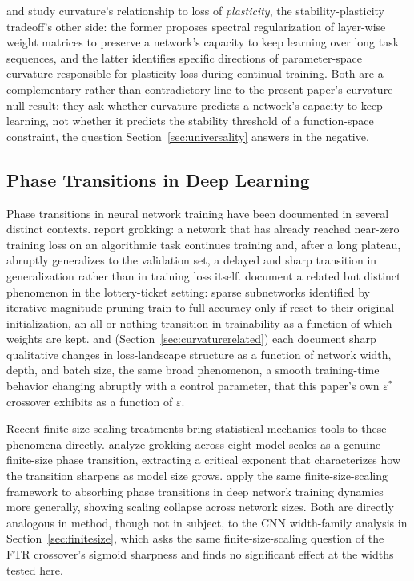 \documentclass[11pt]{article}
\newcommand{\eps}{\varepsilon}
\newcommand{\epsstar}{\eps^{*}}
\begin{document}
\citet{lewandowski2025spectral} and \citet{lewandowski2024directions}
study curvature's relationship to loss of \emph{plasticity}, the
stability-plasticity tradeoff's other side: the former proposes spectral
regularization of layer-wise weight matrices to preserve a network's
capacity to keep learning over long task sequences, and the latter
identifies specific directions of parameter-space curvature responsible
for plasticity loss during continual training. Both are a complementary
rather than contradictory line to the present paper's curvature-null
result: they ask whether curvature predicts a network's capacity to keep
learning, not whether it predicts the stability threshold of a
function-space constraint, the question Section~\ref{sec:universality}
answers in the negative.

\subsection{Phase Transitions in Deep Learning}
Phase transitions in neural network training have been documented in
several distinct contexts. \citet{power2022grokking} report grokking: a
network that has already reached near-zero training loss on an
algorithmic task continues training and, after a long plateau, abruptly
generalizes to the validation set, a delayed and sharp transition in
generalization rather than in training loss itself. \citet{frankle2018lottery}
document a related but distinct phenomenon in the lottery-ticket setting:
sparse subnetworks identified by iterative magnitude pruning train to full
accuracy only if reset to their original initialization, an all-or-nothing
transition in trainability as a function of which weights are kept.
\citet{li2018visualizing} and \citet{keskar2016large}
(Section~\ref{sec:curvaturerelated}) each document sharp qualitative
changes in loss-landscape structure as a function of network width, depth,
and batch size, the same broad phenomenon, a smooth training-time behavior
changing abruptly with a control parameter, that this paper's own
$\epsstar$ crossover exhibits as a function of $\eps$.

Recent finite-size-scaling treatments bring statistical-mechanics tools to
these phenomena directly. \citet{grokking2026dimensional} analyze grokking
across eight model scales as a genuine finite-size phase transition,
extracting a critical exponent that characterizes how the transition
sharpens as model size grows. \citet{scaling2023universal} apply the same
finite-size-scaling framework to absorbing phase transitions in deep
network training dynamics more generally, showing scaling collapse across
network sizes. Both are directly analogous in method, though not in
subject, to the CNN width-family analysis in Section~\ref{sec:finitesize},
which asks the same finite-size-scaling question of the FTR crossover's
sigmoid sharpness and finds no significant effect at the widths tested
here.
\end{document}
